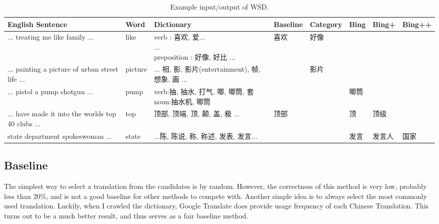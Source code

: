 \begin{CJK}{UTF8}{gbsn}
\begin{table*}[t]
  \caption{Example input/output of WSD.}
  \label{table:wsd_1}
  \begin{center}
  \begin{tabular}{| p{3cm} | p{1cm} | p{3.5cm} | p{1.2cm} | p{1.3cm}| p{0.8cm} | p{0.9cm} | p{1cm} |}
    \hline
    English Sentence & Word & Dictionary & Baseline & Category & Bing & Bing+ & Bing++ \\
    \hline
    ... treating me like family ... & like & \parbox[t]{3cm}{verb : 喜欢, 爱...\\ ... \\preposition : 好像, 好比 ...} & 喜欢 & 好像 & & & \\
    \hline
    ... painting a picture of urban street life ... & picture & \parbox[t]{3cm}{... 相, 影, 影片(entertainment), 帧, 想象, 画 ...} & & 影片 & & & \\
    \hline
    ... pistol a pump shotgun ... & pump & \parbox[t]{3cm}{verb:抽, 抽水, 打气, 唧, 唧筒, 套\\ noun:抽水机, 唧筒} & & & 唧筒 & & \\
    \hline
    ... have made it into the worlds top 40 clubs ... & top & \parbox[t]{3cm}{顶部, 顶端, 顶, 颠, 盖, 极 ...} & 顶部 &  & 顶 & 顶级 & \\
    \hline
    state department spokeswoman ... & state & \parbox[t]{3cm}{...陈, 陈说, 称, 称述, 发表, 发言...} & & & 发言 & 发言人 & 国家 \\
    \hline
  \end{tabular}
  \end{center}
\end{table*}

\subsection{Baseline}
The simplest way to select a translation from the candidates is by random. However, the correctness of this method is very low, probably less than 20\%, and is not a good baseline for other methods to compete with. Another simple idea is to always select the most commonly used translation. Luckily, when I crawled the dictionary, Google Translate does provide usage frequency of each Chinese Translation.  This turns out to be a much better result, and thus serves as a fair baseline method.


\end{CJK}
